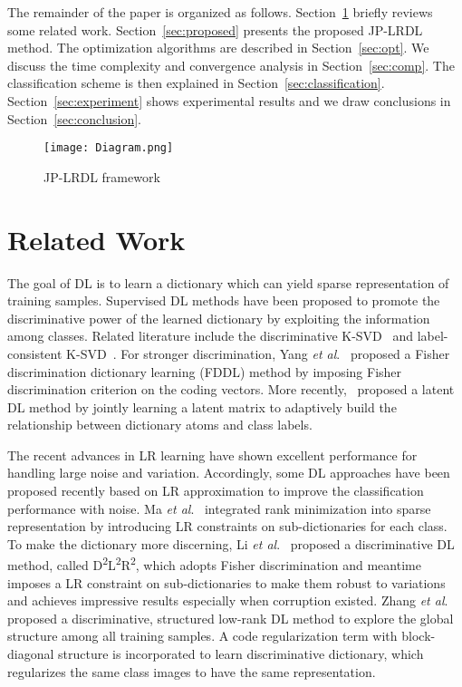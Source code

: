 \documentclass[journal]{IEEEtran}
\newcommand{\etal}{\textit{et al}.}
\begin{document}
The remainder of the paper is organized as follows. Section~\ref{sec:rel} briefly reviews some related work. Section~\ref{sec:proposed} presents the proposed JP-LRDL method. The optimization algorithms are described in Section~\ref{sec:opt}. We discuss the time complexity and convergence analysis in Section~\ref{sec:comp}. The classification scheme is then explained in Section~\ref{sec:classification}. Section~\ref{sec:experiment} shows experimental results and we draw conclusions in Section~\ref{sec:conclusion}.
\begin{figure}[t]
\centering
\texttt{[image: Diagram.png]}
\caption{JP-LRDL framework}
\label{fig:Diagram}
\vspace{-1.5em}
\end{figure}
\section{Related Work}
\label{sec:rel}
The goal of DL is to learn a dictionary which can yield sparse representation of training samples. Supervised DL methods have been proposed to promote the discriminative power of the learned dictionary by exploiting the information among classes. Related literature include the discriminative K-SVD~\cite{DKSVD} and label-consistent K-SVD~\cite{LC-KSVD}. For stronger discrimination, Yang \etal~\cite{FDDL} proposed a Fisher discrimination dictionary learning (FDDL) method by imposing Fisher discrimination criterion on the coding vectors. More recently,~\cite{Latent-DL} proposed a latent DL method by jointly learning a latent matrix to adaptively build the relationship between dictionary atoms and class labels.

The recent advances in LR learning have shown excellent performance for handling large noise and variation. Accordingly, some DL approaches have been proposed recently based on LR approximation to improve the classification performance with noise. Ma \etal~\cite{DLRD-SR} integrated rank minimization into sparse representation by introducing LR constraints on sub-dictionaries for each class. To make the dictionary more discerning, Li \etal~\cite{D2L2R2} proposed a discriminative DL method, called D\textsuperscript{2}L\textsuperscript{2}R\textsuperscript{2}, which adopts Fisher discrimination and meantime imposes a LR constraint on sub-dictionaries to make them robust to variations and achieves impressive results especially when corruption existed. Zhang \etal~\cite{Structured-LR-DL} proposed a discriminative, structured low-rank DL method to explore the global structure among all training samples. A code regularization term with block-diagonal structure is incorporated to learn discriminative dictionary, which regularizes the same class images to have the same representation.
\end{document}
